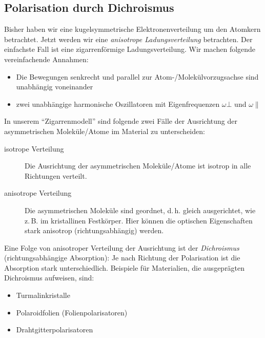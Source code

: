 \subsection{Polarisation durch Dichroismus}
Bisher haben wir eine kugelsymmetrische Elektronenverteilung um den
Atomkern betrachtet. Jetzt werden wir eine \emph{anisotrope
  Ladungsverteilung} betrachten. Der einfachste Fall ist eine
zigarrenförmige Ladungsverteilung.
Wir machen folgende vereinfachende Annahmen:
\begin{itemize}
\item Die Bewegungen senkrecht und parallel zur
  Atom-/Molekülvorzugsachse sind unabhängig voneinander 
\item zwei unabhängige harmonische Oszillatoren mit Eigenfrequenzen
  $\omega\bot$%
  und $\omega\parallel$%
\end{itemize}
In unserem \enquote{Zigarrenmodell} sind folgende zwei Fälle der
Ausrichtung der asymmetrischen Moleküle/Atome im Material zu
unterscheiden:
\begin{description}
\item[isotrope Verteilung] Die Ausrichtung der asymmetrischen
  Moleküle/Atome ist isotrop in alle Richtungen verteilt.
\item[anisotrope Verteilung] Die asymmetrischen Moleküle
  sind geordnet, d.\,h. gleich ausgerichtet, wie z.\,B. im
  kristallinen Festkörper. Hier können die optischen Eigenschaften
  stark anisotrop (richtungsabhängig) werden.
\end{description}
Eine Folge von anisotroper Verteilung der Ausrichtung ist der
\emph{Dichroismus} (richtungsabhängige Absorption):
Je nach Richtung der Polarisation ist die Absorption stark
unterschiedlich.
Beispiele für Materialien, die ausgeprägten Dichroismus aufweisen,
sind:
\begin{itemize}
\item Turmalinkristalle
\item Polaroidfolien (Folienpolarisatoren)
\item Drahtgitterpolarisatoren
\end{itemize}


